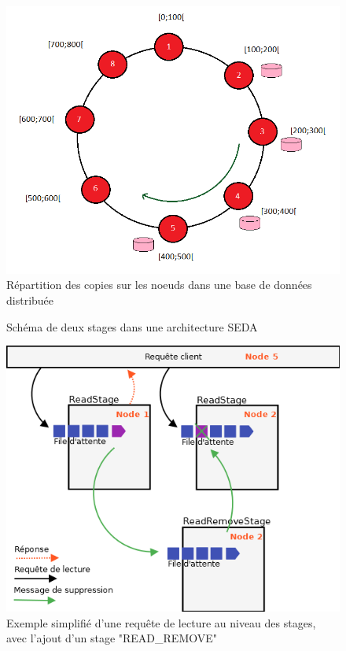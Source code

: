 \documentclass[12pt]{article}
\begin{document}
\begin{figure}[H]
	\centering
        \includegraphics[width=12cm]{images/besoins/replication.png}
    \caption{Répartition des copies sur les noeuds dans une base de données distribuée \label{fig:replication}}
\end{figure}

\clearpage


\begin{figure}[p]
	\centering
		
	\caption{Schéma de deux stages dans une architecture SEDA \label{fig:stages}}
\end{figure}

\begin{figure}[p]
	\centering
		\includegraphics[width=15cm]{images/architecture/read_request.png}
	\caption{Exemple simplifié d'une requête de lecture au niveau des stages, avec l'ajout d'un stage "READ\_REMOVE" \label{fig:read_request}}
\end{figure}
\end{document}
